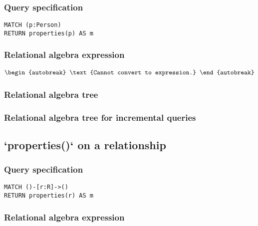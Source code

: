 \subsubsection*{Query specification}

\begin{lstlisting}
MATCH (p:Person)
RETURN properties(p) AS m
\end{lstlisting}

\subsubsection*{Relational algebra expression}

\begin{align*}
\begin{autobreak}
\text{Cannot convert to expression.}
\end{autobreak}
\end{align*}

\subsubsection*{Relational algebra tree}


\subsubsection*{Relational algebra tree for incremental queries}


\subsection{`properties()` on a relationship}

\subsubsection*{Query specification}

\begin{lstlisting}
MATCH ()-[r:R]->()
RETURN properties(r) AS m
\end{lstlisting}

\subsubsection*{Relational algebra expression}

